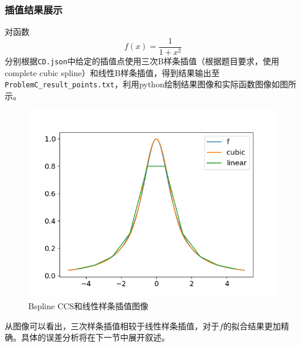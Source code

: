 \documentclass{ctexart}
\begin{document}
\begin{sloppypar}
\subsubsection{插值结果展示}
对函数
\begin{equation}
    f(x) = \frac{1}{1+x^2}
\end{equation}
分别根据\verb|CD.json|中给定的插值点使用三次B样条插值（根据题目要求，使用complete cubic spline）和线性B样条插值，得到结果输出至\verb|ProblemC_result_points.txt|，利用python绘制结果图像和实际函数图像如图所示。
\begin{figure}[H]
\centering
\includegraphics[scale = 0.5]{fig//ProblemC_Bspline_1&3.png}
\caption{Bspline CCS和线性样条插值图像}
\label{fig8}
\end{figure}
从图像可以看出，三次样条插值相较于线性样条插值，对于$f$的拟合结果更加精确。具体的误差分析将在下一节中展开叙述。


\end{sloppypar}
\end{document}
